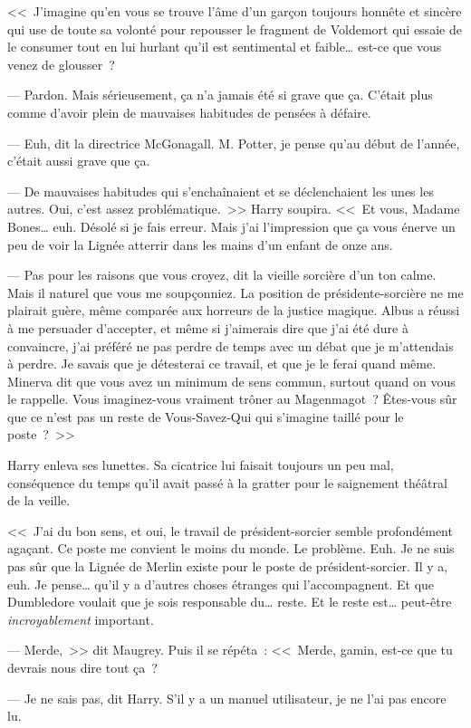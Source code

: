 <<~J'imagine qu'en vous se trouve l'âme d'un garçon toujours honnête et sincère qui use de toute sa volonté pour repousser le fragment de Voldemort qui essaie de le consumer tout en lui hurlant qu'il est sentimental et faible… est-ce que vous venez de glousser~?

--- Pardon. Mais sérieusement, ça n'a jamais été si grave que ça. C'était plus comme d'avoir plein de mauvaises habitudes de pensées à défaire.

--- Euh, dit la directrice McGonagall. M. Potter, je pense qu'au début de l'année, c'était aussi grave que ça.

--- De mauvaises habitudes qui s'enchaînaient et se déclenchaient les unes les autres. Oui, c'est assez problématique.~>> Harry soupira. <<~Et vous, Madame Bones… euh. Désolé si je fais erreur. Mais j'ai l'impression que ça vous énerve un peu de voir la Lignée atterrir dans les mains d'un enfant de onze ans.

--- Pas pour les raisons que vous croyez, dit la vieille sorcière d'un ton calme. Mais il naturel que vous me soupçonniez. La position de présidente-sorcière ne me plairait guère, même comparée aux horreurs de la justice magique. Albus a réussi à me persuader d'accepter, et même si j'aimerais dire que j'ai été dure à convaincre, j'ai préféré ne pas perdre de temps avec un débat que je m'attendais à perdre. Je savais que je détesterai ce travail, et que je le ferai quand même. Minerva dit que vous avez un minimum de sens commun, surtout quand on vous le rappelle. Vous imaginez-vous vraiment trôner au Magenmagot~? Êtes-vous sûr que ce n'est pas un reste de Vous-Savez-Qui qui s'imagine taillé pour le poste~?~>>

Harry enleva ses lunettes. Sa cicatrice lui faisait toujours un peu mal, conséquence du temps qu'il avait passé à la gratter pour le saignement théâtral de la veille.

<<~J'ai du bon sens, et oui, le travail de président-sorcier semble profondément agaçant. Ce poste me convient le moins du monde. Le problème. Euh. Je ne suis pas sûr que la Lignée de Merlin existe pour le poste de président-sorcier. Il y a, euh. Je pense… qu'il y a d'autres choses étranges qui l'accompagnent. Et que Dumbledore voulait que je sois responsable du… reste. Et le reste est… peut-être \emph{incroyablement} important.

--- Merde,~>> dit Maugrey. Puis il se répéta~: <<~Merde, gamin, est-ce que tu devrais nous dire tout ça~?

--- Je ne sais pas, dit Harry. S'il y a un manuel utilisateur, je ne l'ai pas encore lu.

